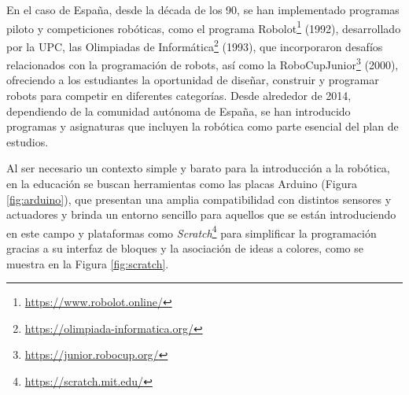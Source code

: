 En el caso de España, desde la década de los 90, se han implementado programas
piloto y competiciones robóticas, como el programa
Robolot\footnote{\url{https://www.robolot.online/}} (1992), desarrollado por la
UPC, las Olimpiadas de
Informática\footnote{\url{https://olimpiada-informatica.org/}} (1993), que
incorporaron desafíos relacionados con la programación de robots, así como la
RoboCupJunior\footnote{\url{https://junior.robocup.org/}} (2000), ofreciendo a
los estudiantes la oportunidad de diseñar, construir y programar robots para
competir en diferentes categorías.
Desde alrededor de 2014, dependiendo de la comunidad autónoma de España, se han
introducido programas y asignaturas que incluyen la robótica como parte esencial
del plan de estudios.

Al ser necesario un contexto simple y barato para la introducción a la robótica,
en la educación se buscan herramientas como las placas Arduino (Figura
\ref{fig:arduino}), que presentan una amplia compatibilidad con distintos
sensores y actuadores y brinda un entorno sencillo para aquellos que se están
introduciendo en este campo y plataformas como
\textit{Scratch}\footnote{\url{https://scratch.mit.edu/}} para simplificar la
programación gracias a su interfaz de bloques y la asociación de ideas a
colores, como se muestra en la Figura \ref{fig:scratch}.

